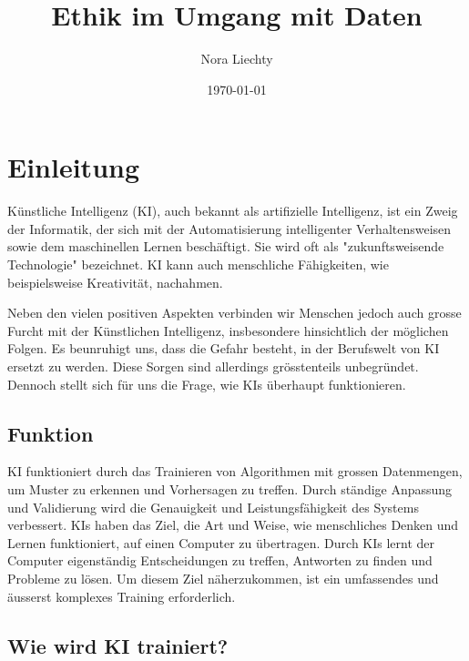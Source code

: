 \documentclass{report}
\title{Ethik im Umgang mit Daten}
\author{Nora Liechty}
\date{\today}
\begin{document}
\maketitle


\tableofcontents

\chapter{Einleitung}

Künstliche Intelligenz (KI), auch bekannt als artifizielle Intelligenz, ist ein Zweig der Informatik, der sich mit der Automatisierung intelligenter Verhaltensweisen sowie dem maschinellen Lernen beschäftigt. Sie wird oft als "zukunftsweisende Technologie" bezeichnet. KI kann auch menschliche Fähigkeiten, wie beispielsweise Kreativität, nachahmen.

Neben den vielen positiven Aspekten verbinden wir Menschen jedoch auch grosse Furcht mit der Künstlichen Intelligenz, insbesondere hinsichtlich der möglichen Folgen. Es beunruhigt uns, dass die Gefahr besteht, in der Berufswelt von KI ersetzt zu werden. Diese Sorgen sind allerdings grösstenteils unbegründet.
Dennoch stellt sich für uns die Frage, wie KIs überhaupt funktionieren. 

\section{Funktion}

KI funktioniert durch das Trainieren von Algorithmen mit grossen Datenmengen, um Muster zu erkennen und Vorhersagen zu treffen. Durch ständige Anpassung und Validierung wird die Genauigkeit und Leistungsfähigkeit des Systems verbessert. KIs haben das Ziel, die Art und Weise, wie menschliches Denken und Lernen funktioniert, auf einen Computer zu übertragen. Durch KIs lernt der Computer eigenständig Entscheidungen zu treffen, Antworten zu finden und Probleme zu lösen. Um diesem Ziel näherzukommen, ist ein umfassendes und äusserst komplexes Training erforderlich.

\section{Wie wird KI trainiert?}
\end{document}
